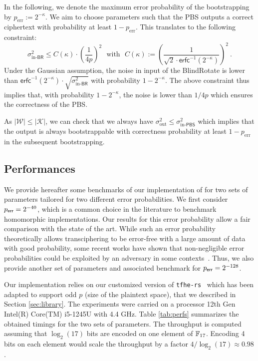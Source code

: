 In the following, we denote the maximum error probability of the bootstrapping by $p_{\text{err}} := 2^{-\kappa}$. We aim to choose parameters such that the PBS outputs a correct ciphertext with probability at least $1-p_{\text{err}}$. This translates to the following constraint:
$$\sigma^2_{\text{in-}\textsf{BR}} \leq  C(\kappa) \cdot \left(\frac1{4p}\right)^2 ~~~\text{with}~~~C(\kappa) := \left(\frac{1}{\sqrt{2} \cdot \mathsf{erfc}^{-1}(2^{-\kappa})}\right)^2 ~.$$
Under the Gaussian assumption, the noise in input of the \textsf{BlindRotate} is lower than $\mathsf{erfc}^{-1}(2^{-\kappa}) \cdot \sqrt{\sigma^2_{\text{in-}\textsf{BR}}}$ with probability $1-2^{-\kappa}$. The above constraint thus implies that, with probability $1-2^{-\kappa}$, the noise is lower than $1/{4p}$ which ensures the correctness of the PBS. 

As $|\mathcal W| \leq |\mathcal K|$, we can check that we always have $\sigma^2_{\text{out}} \leq \sigma^2_{\text{in-}\textsf{PBS}}$ which implies that the output is always bootstrappable with correctness probability at least $1-p_{\text{err}}$ in the subsequent bootstrapping.


\subsection{Performances} \label{sec:performances}

We provide hereafter some benchmarks of our implementation of \coolName for two sets of parameters tailored for two different error probabilities. We first consider $p_{\textsf{err}} = 2^{-40}$, which is a common choice in the literature to benchmark homomorphic implementations. Our results for this error probability allow a fair comparison with the state of the art. While such an error probability theoretically allows transciphering to be error-free with a large amount of data with good probability, some recent works have shown that non-negligible error probabilities could be exploited by an adversary in some contexts~\cite{C:CSBB24,CCS:CCPSS24}. Thus, we also provide another set of parameters and associated benchmark for $p_{\textsf{err}} =  2^{-128}$.

Our implementation relies on our customized version of \texttt{tfhe-rs}~\cite{tfhe-rs} which has been adapted to support odd $p$ (size of the plaintext space), that we described in Section \ref{sec:library}. The experiments were carried on a processor 12th Gen Intel(R) Core(TM) i5-1245U with 4.4 GHz. Table \ref{tab:perfs} summarizes the obtained timings for the two sets of parameters. The throughput is computed assuming that $\log_2(17)$ bits are encoded on one element of $\mathbb{F}_{17}$. Encoding 4 bits on each element would scale the throughput by a factor $4/\log_2(17) \approx 0.98$.

